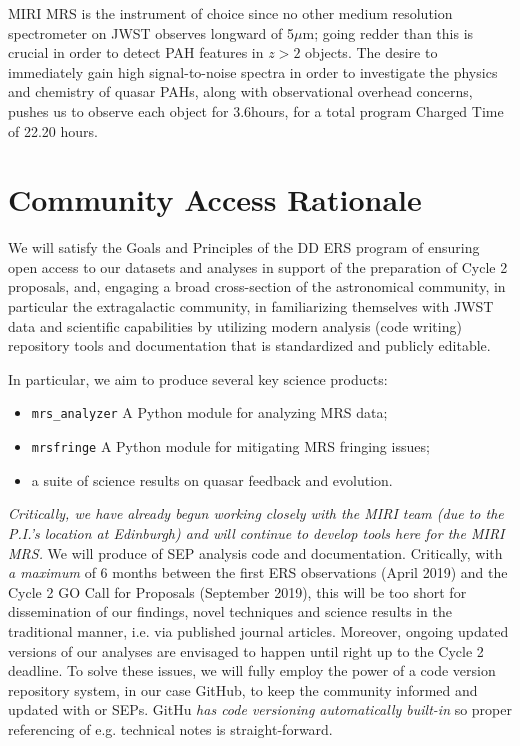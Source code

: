 \smallskip \smallskip
\noindent
MIRI MRS is the instrument of choice since no other medium resolution
spectrometer on JWST observes longward of 5$\mu$m; going redder than
this is crucial in order to detect PAH features in $z>2$ objects.  The
desire to immediately gain high signal-to-noise spectra in order to
investigate the physics and chemistry of quasar PAHs, along with
observational overhead concerns, pushes us to observe each object for
3.6hours, for a total program Charged Time of 22.20 hours.



\section*{Community Access Rationale}
\vspace{-6pt}
\noindent
We will satisfy the Goals and Principles of the DD ERS program of
ensuring open access to our datasets and analyses in support of the
preparation of Cycle 2 proposals, and, engaging a broad cross-section
of the astronomical community, in particular the extragalactic
community, in familiarizing themselves with JWST data and scientific
capabilities by utilizing modern analysis (code writing) repository
tools and documentation that is standardized and publicly editable.

\noindent
In particular, we aim to produce several key science products:
\begin{itemize}
\item {\tt mrs\_analyzer} A Python module for analyzing MRS data; 
\item {\tt mrsfringe} A Python module for mitigating MRS fringing issues; 
\item a suite of science results on quasar feedback and evolution. 
\end{itemize}

\noindent
{\it Critically, we have already begun working closely with the MIRI
team (due to the P.I.'s location at Edinburgh) and will continue to
develop tools here for the MIRI MRS.}
We will produce of SEP analysis code and documentation.  Critically,
with {\it a maximum} of 6 months between the first ERS observations
(April 2019) and the Cycle 2 GO Call for Proposals (September 2019),
this will be too short for dissemination of our findings, novel
techniques and science results in the traditional manner, i.e. via
published journal articles. Moreover, ongoing updated versions of our
analyses are envisaged to happen until right up to the Cycle 2
deadline.  To solve these issues, we will fully employ the power of a
code version repository system, in our case GitHub, to keep the
community informed and updated with or SEPs. GitHu {\it has code
versioning automatically built-in} so proper referencing of
e.g. technical notes is straight-forward.






